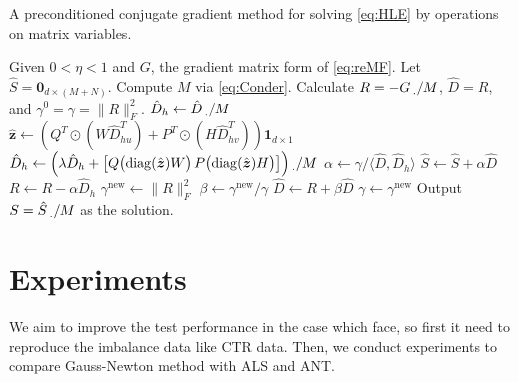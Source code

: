 \documentclass[11pt,twoside]{article}
\newcommand{\bsym}[1]{\ensuremath{\boldsymbol{#1}}}
\newcommand{\bz}{\ensuremath{\bsym{z}}}
\DeclareMathOperator*{\diag}{diag}
\begin{document}
\begin{algorithm}[t]
    \caption{A preconditioned conjugate gradient method for solving \eqref{eq:HLE} by operations on matrix variables.}
    \label{alg:Pcg}
    \begin{algorithmic}[1]
        \State Given $0<\eta<1$ and $G$, the gradient matrix form of \eqref{eq:reMF}. Let $\hat{S}=\bsym{0}_{d\times (M+N)}$.
        \State Compute $M$ via \eqref{eq:Conder}.
        \State Calculate $R = -G \prescript{}{\cdot}{/} M$, $\hat{D}=R$, and $\gamma^0=\gamma=\|R\|_F^2$.
            \State $\hat{D}_h \gets \hat{D} \prescript{}{\cdot}{/} M$
            \State $\hat{\bz}\gets \left( {Q^T}\odot{(W\hat{D}_{hu}^T)}+{P^T}\odot{(H\hat{D}_{hv}^T)} \right) \bsym{1}_{d\times 1}$
            \State $\hat{D}_h \gets \left(\lambda \hat{D}_h + \begin{bmatrix} Q \bigl(\diag(\hat{\bz}) W \bigr) \, P \bigl ( \diag(\hat{\bz}) H \bigr) \end{bmatrix}\right) \prescript{}{\cdot}{/} M$
            \State $\alpha \gets \gamma / \langle \hat{D},\hat{D}_h \rangle$
            \State $\hat{S} \gets\hat{S}+\alpha \hat{D}$
            \State $R \gets R-\alpha \hat{D}_h$
            \State $\gamma^{\text{new}} \gets \|R\|_F^2$
            \State $\beta \gets \gamma^{\text{new}}/\gamma$
            \State $\hat{D} \gets R+\beta \hat{D}$
            \State $\gamma \gets \gamma^{\text{new}}$
        \EndWhile
        \State Output $S=\hat{S} \prescript{}{\cdot}{/} M$ as the solution.
    \end{algorithmic}
\end{algorithm}

\section{Experiments}
We aim to improve the test performance in the case which \cite{test17a} face, so first it need to reproduce the imbalance data like CTR data. Then, we conduct experiments to compare Gauss-Newton method with ALS and ANT.  
\end{document}
